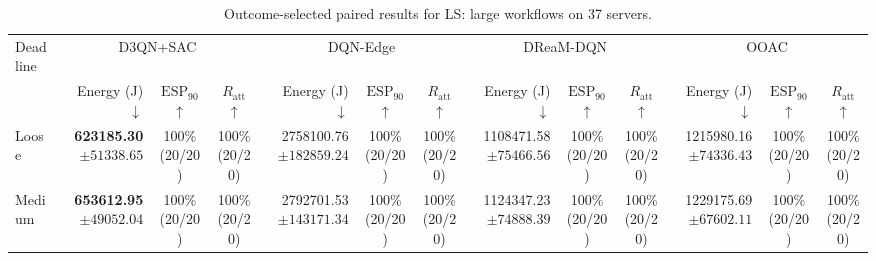 \documentclass[10pt]{article}
\begin{document}
\begin{table}[!htbp]
\centering
\caption{Outcome-selected paired results for LS: large workflows on 37 servers.}
\label{tab:conditional_case_ls}
\begingroup
\footnotesize
\setlength{\tabcolsep}{2.2pt}
\renewcommand{\arraystretch}{1.08}
\begin{tabular}{@{}l*{4}{rcc}@{}}
\toprule
Deadline & \multicolumn{3}{c}{D3QN+SAC} & \multicolumn{3}{c}{DQN-Edge} & \multicolumn{3}{c}{DReaM-DQN} & \multicolumn{3}{c}{OOAC} \\
\cmidrule(lr){2-4}\cmidrule(lr){5-7}\cmidrule(lr){8-10}\cmidrule(lr){11-13}
 & Energy (J) $\downarrow$ & $\mathrm{ESP}_{90}$ $\uparrow$ & $R_{\mathrm{att}}$ $\uparrow$ & Energy (J) $\downarrow$ & $\mathrm{ESP}_{90}$ $\uparrow$ & $R_{\mathrm{att}}$ $\uparrow$ & Energy (J) $\downarrow$ & $\mathrm{ESP}_{90}$ $\uparrow$ & $R_{\mathrm{att}}$ $\uparrow$ & Energy (J) $\downarrow$ & $\mathrm{ESP}_{90}$ $\uparrow$ & $R_{\mathrm{att}}$ $\uparrow$ \\
\midrule
Loose & \shortstack[r]{\textbf{623185.30}\\$\pm 51338.65$} & \shortstack[c]{100\%\\(20/20)} & \shortstack[c]{100\%\\(20/20)} & \shortstack[r]{2758100.76\\$\pm 182859.24$} & \shortstack[c]{100\%\\(20/20)} & \shortstack[c]{100\%\\(20/20)} & \shortstack[r]{1108471.58\\$\pm 75466.56$} & \shortstack[c]{100\%\\(20/20)} & \shortstack[c]{100\%\\(20/20)} & \shortstack[r]{1215980.16\\$\pm 74336.43$} & \shortstack[c]{100\%\\(20/20)} & \shortstack[c]{100\%\\(20/20)} \\
Medium & \shortstack[r]{\textbf{653612.95}\\$\pm 49052.04$} & \shortstack[c]{100\%\\(20/20)} & \shortstack[c]{100\%\\(20/20)} & \shortstack[r]{2792701.53\\$\pm 143171.34$} & \shortstack[c]{100\%\\(20/20)} & \shortstack[c]{100\%\\(20/20)} & \shortstack[r]{1124347.23\\$\pm 74888.39$} & \shortstack[c]{100\%\\(20/20)} & \shortstack[c]{100\%\\(20/20)} & \shortstack[r]{1229175.69\\$\pm 67602.11$} & \shortstack[c]{100\%\\(20/20)} & \shortstack[c]{100\%\\(20/20)} \\

\end{tabular}
\end{table}
\end{document}

